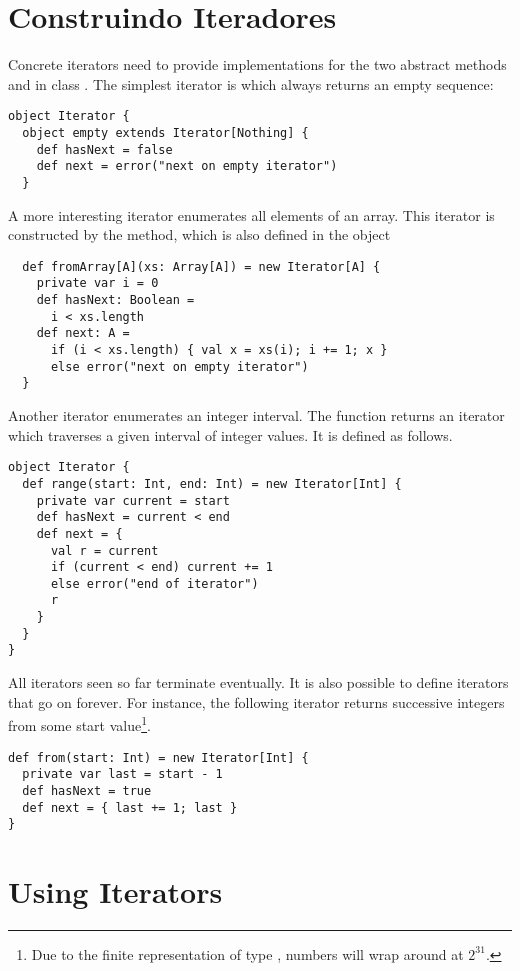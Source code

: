 {\section{Construindo Iteradores}

Concrete iterators need to provide implementations for the two
abstract methods  and  in class
. The simplest iterator is  which
always returns an empty sequence:
\begin{lstlisting}
object Iterator {
  object empty extends Iterator[Nothing] {
    def hasNext = false
    def next = error("next on empty iterator")
  }
\end{lstlisting}
A more interesting iterator enumerates all elements of an array. This
iterator is constructed by the  method, which is also defined in the object 
\begin{lstlisting}
  def fromArray[A](xs: Array[A]) = new Iterator[A] {
    private var i = 0
    def hasNext: Boolean =
      i < xs.length
    def next: A =
      if (i < xs.length) { val x = xs(i); i += 1; x }
      else error("next on empty iterator")
  }
\end{lstlisting}
Another iterator enumerates an integer interval.  The
 function returns an iterator which traverses a
given interval of integer values. It is defined as follows.
\begin{lstlisting}
object Iterator {
  def range(start: Int, end: Int) = new Iterator[Int] {
    private var current = start
    def hasNext = current < end
    def next = {
      val r = current
      if (current < end) current += 1
      else error("end of iterator")
      r
    }
  }
}
\end{lstlisting}
All iterators seen so far terminate eventually. It is also possible to
define iterators that go on forever. For instance, the following
iterator returns successive integers from some start
value\footnote{Due to the finite representation of type ,
numbers will wrap around at $2^{31}$.}.
\begin{lstlisting}
def from(start: Int) = new Iterator[Int] {
  private var last = start - 1
  def hasNext = true
  def next = { last += 1; last }
}
\end{lstlisting}

\section{Using Iterators}

}
